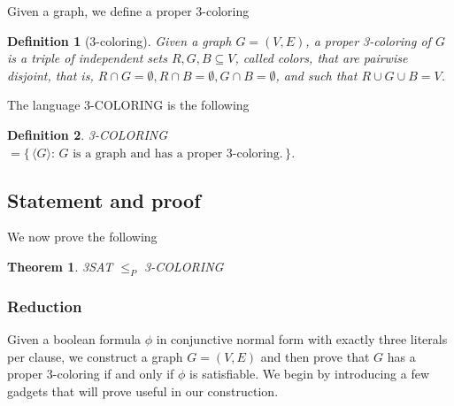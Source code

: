 \documentclass{article}
\newcommand{\theoremname}{Theorem}
\newcommand{\definitionname}{Definition}
\newtheorem{theorem}{\theoremname}
\newtheorem{definition}{\definitionname}
\newcommand{\st}{\colon\,}
\begin{document}
Given a graph, we define a proper 3-coloring
\begin{definition}[3-coloring]
  Given a graph $G=(V,E)$, a proper 3-coloring of $G$ is a triple of
  independent sets $R,G,B\subseteq V$, called colors, that are pairwise
  disjoint, that is, $R\cap G =\emptyset,R\cap B=\emptyset,G\cap B =\emptyset$,
  and such that $R\cup G\cup B = V$.
\end{definition}

The language 3-COLORING is the following
\begin{definition}
  3-COLORING $= \{\, \langle G \rangle \st \text{$G$ is a graph and has
  a proper 3-coloring.}\,\}$.
\end{definition}

\subsection{Statement and proof}

We now prove the following
\begin{theorem}
	3SAT $\le_P$ 3-COLORING
\end{theorem}

\subsubsection{Reduction}

Given a boolean formula $\phi$ in conjunctive normal form with exactly three
literals per clause, we construct a graph $G = (V,E)$ and then prove that $G$
has a proper 3-coloring if and only if $\phi$ is satisfiable. We begin by
introducing a few gadgets that will prove useful in our construction.
\end{document}

